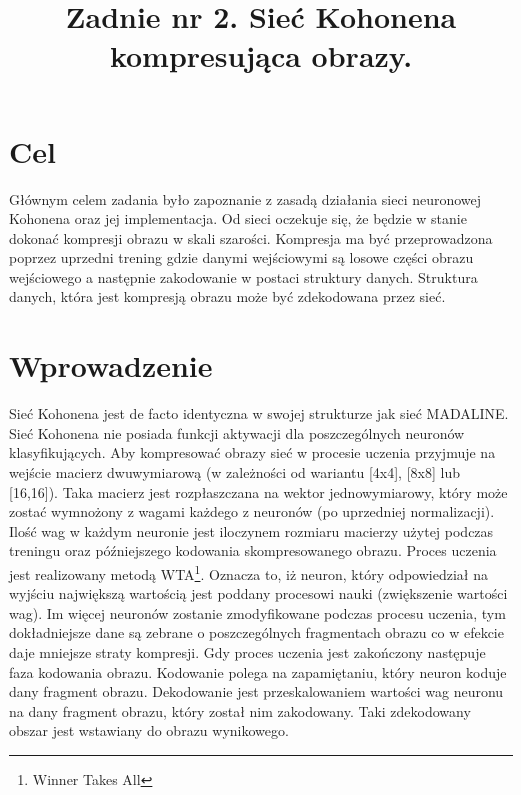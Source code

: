 \documentclass{classrep}
\author{
  \studentinfo{Szymon Łyszkowski}{206809}\and
  \studentinfo{Piotr Kluch}{206799}
}
\title{Zadnie nr 2. Sieć Kohonena kompresująca obrazy.}
\begin{document}
\maketitle

\section{Cel}
{
Głównym celem zadania było zapoznanie z zasadą działania sieci neuronowej Kohonena oraz jej implementacja. Od sieci oczekuje się, że będzie w stanie dokonać kompresji obrazu w skali szarości. Kompresja ma być przeprowadzona poprzez uprzedni trening gdzie danymi wejściowymi są losowe części obrazu wejściowego a następnie zakodowanie w postaci struktury danych. Struktura danych, która jest kompresją obrazu może być zdekodowana przez sieć.}

\section{Wprowadzenie}
{Sieć Kohonena jest de facto identyczna w swojej strukturze jak sieć MADALINE. Sieć Kohonena nie posiada funkcji aktywacji dla poszczególnych neuronów klasyfikujących. Aby kompresować obrazy sieć w procesie uczenia przyjmuje na wejście macierz dwuwymiarową (w zależności od wariantu [4x4], [8x8] lub [16,16]). Taka macierz jest rozpłaszczana na wektor jednowymiarowy, który może zostać wymnożony z wagami każdego z neuronów (po uprzedniej normalizacji). Ilość wag w każdym neuronie jest iloczynem rozmiaru macierzy użytej podczas treningu oraz późniejszego kodowania skompresowanego obrazu. Proces uczenia jest realizowany metodą WTA\footnote{Winner Takes All}. Oznacza to, iż neuron, który odpowiedział na wyjściu największą wartością jest poddany procesowi nauki (zwiększenie wartości wag). Im więcej neuronów zostanie zmodyfikowane podczas procesu uczenia, tym dokładniejsze dane są zebrane o poszczególnych fragmentach obrazu co w efekcie daje mniejsze straty kompresji. Gdy proces uczenia jest zakończony następuje faza kodowania obrazu. Kodowanie polega na zapamiętaniu, który neuron koduje dany fragment obrazu. Dekodowanie jest przeskalowaniem wartości wag neuronu na dany fragment obrazu, który został nim zakodowany. Taki zdekodowany obszar jest wstawiany do obrazu wynikowego.
}
\end{document}
